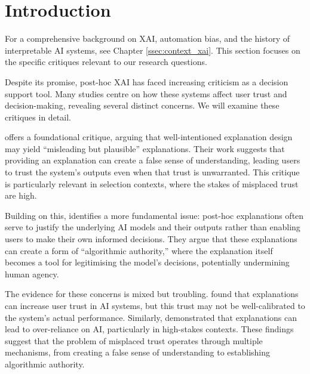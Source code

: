 
\section{Introduction}
For a comprehensive background on XAI, automation bias, and the history of interpretable AI systems, see Chapter \ref{ssec:context_xai}. This section focuses on the specific critiques relevant to our research questions.

Despite its promise, post-hoc XAI has faced increasing criticism as a decision support tool. Many studies centre on how these systems affect user trust and decision-making, revealing several distinct concerns. We will examine these critiques in detail.

\textcite{Lipton} offers a foundational critique, arguing that well-intentioned explanation design may yield ``misleading but plausible'' explanations. Their work suggests that providing an explanation can create a false sense of understanding, leading users to trust the system's outputs even when that trust is unwarranted. This critique is particularly relevant in selection contexts, where the stakes of misplaced trust are high.

Building on this, \textcite{miller_explainable_2023} identifies a more fundamental issue: post-hoc explanations often serve to justify the underlying AI models and their outputs rather than enabling users to make their own informed decisions. They argue that these explanations can create a form of ``algorithmic authority,'' where the explanation itself becomes a tool for legitimising the model's decisions, potentially undermining human agency.

The evidence for these concerns is mixed but troubling. \textcite{lai_human_2019} found that explanations can increase user trust in AI systems, but this trust may not be well-calibrated to the system's actual performance. Similarly, \textcite{jacobs_how_2021} demonstrated that explanations can lead to over-reliance on AI, particularly in high-stakes contexts. These findings suggest that the problem of misplaced trust operates through multiple mechanisms, from creating a false sense of understanding to establishing algorithmic authority.

